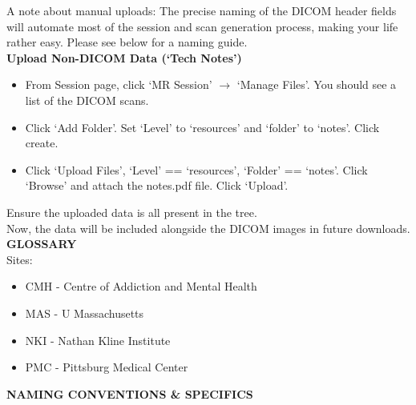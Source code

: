 \documentclass[a4paper,11pt,oneside]{book}
\newcommand\headings{
\noindent
\large
\leftskip=0.15in
\textbf
}
\newcommand\titlesR{%
    \noindent
    \small
    \leftskip=0.15in
    \textbf
}
\newcommand\stepsL{
    \noindent
    \leftskip=0.15in
    \small
}
\newcommand\stepsR{
    \noindent
    \leftskip=0.3in
    \small
}
\begin{document}
\begin{multicols}{2}
{\stepsR{A note about manual uploads: The precise naming of the DICOM header fields will automate most of the session and scan generation process, making your life rather easy. Please see below for a naming guide.}\\


%
\titlesR{Upload Non-DICOM Data (`Tech Notes')} \\


\stepsR{\begin{itemize}

    \item{From Session page, click `MR Session' $\rightarrow$ `Manage Files'. You should see a list of the DICOM scans.}\\

    \item{Click `Add Folder'. Set `Level' to `resources' and `folder' to `notes'. Click create.}\\

    \item{Click `Upload Files', `Level' == `resources', `Folder' == `notes'. Click `Browse' and attach the notes.pdf file. Click `Upload'.}\\
    
    \end{itemize}
}

\stepsR{Ensure the uploaded data is all present in the tree.}\\

\stepsR{Now, the data will be included alongside the DICOM images in future downloads.}\\

%
\headings{GLOSSARY} \\

\stepsL{Sites:}
\stepsL{\begin{itemize}  
            \item{CMH - Centre of Addiction and Mental Health}
            \item{MAS - U Massachusetts}
            \item{NKI - Nathan Kline Institute}
            \item{PMC - Pittsburg Medical Center}
        \end{itemize}
        }

%
\headings{NAMING CONVENTIONS \& SPECIFICS}\\

}
\end{multicols}
\end{document}
